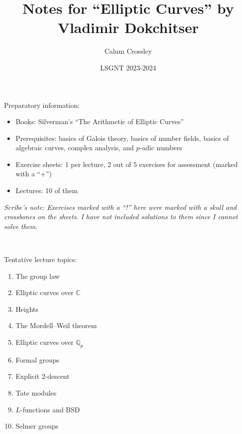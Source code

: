 \documentclass[a4paper]{article}
\title{Notes for ``Elliptic Curves'' by Vladimir Dokchitser}
\author{Calum Crossley}
\date{LSGNT 2023-2024}
\theoremstyle{definition}
\newcommand{\Q}{\mathbb{Q}}
\newcommand{\C}{\mathbb{C}}
\begin{document}
\maketitle

Preparatory information:
\begin{itemize}
    \item Books: Silverman's ``The Arithmetic of Elliptic Curves''
    \item Prerequisites: basics of Galois theory, basics of number fields,
        basics of algebraic curves, complex analysis, and $p$-adic numbers
    \item Exercise sheets: 1 per lecture, 2 out of 5 exercises for assessment
        (marked with a ``+'')
    \item Lectures: 10 of them
\end{itemize}

\textit{Scribe's note: Exercises marked with a ``!'' here were marked with a
    skull and crossbones on the sheets. I have not included solutions to them
    since I cannot solve them.}

~

Tentative lecture topics:
\begin{enumerate}[label=\arabic*)]
    \item The group law
    \item Elliptic curves over $\C$
    \item Heights
    \item The Mordell--Weil theorem
    \item Elliptic curves over $\Q_p$
    \item Formal groups
    \item Explicit 2-descent
    \item Tate modules
    \item $L$-functions and BSD
    \item Selmer groups
\end{enumerate}
\end{document}
